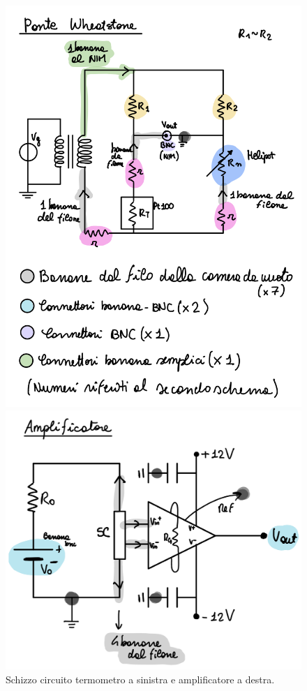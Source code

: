 \documentclass[../main/main.tex]{subfiles}
\begin{document}
\begin{figure}[h!]
\begin{minipage}[c]{0.48\linewidth}
\centering
\includegraphics[width=1\textwidth]{../lessons/image/08/1.png}
\end{minipage}
\hspace{1cm}
\begin{minipage}[]{0.48\linewidth}
\centering
\includegraphics[width=1\textwidth]{../lessons/image/08/2.png}
\end{minipage}
\caption{\label{fig:08_1} Schizzo circuito termometro a sinistra e amplificatore a destra.}
\end{figure}
\end{document}
